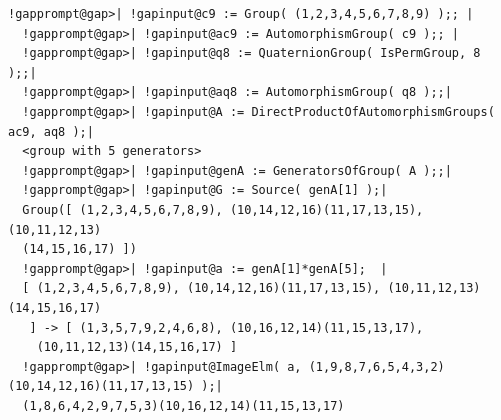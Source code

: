 \documentclass[a4paper,11pt]{report}
\begin{document}
{{\begin{Verbatim}[commandchars=!@|,fontsize=\small,frame=single,label=Example]
  !gapprompt@gap>| !gapinput@c9 := Group( (1,2,3,4,5,6,7,8,9) );; |
  !gapprompt@gap>| !gapinput@ac9 := AutomorphismGroup( c9 );; |
  !gapprompt@gap>| !gapinput@q8 := QuaternionGroup( IsPermGroup, 8 );;|
  !gapprompt@gap>| !gapinput@aq8 := AutomorphismGroup( q8 );;|
  !gapprompt@gap>| !gapinput@A := DirectProductOfAutomorphismGroups( ac9, aq8 );|
  <group with 5 generators>
  !gapprompt@gap>| !gapinput@genA := GeneratorsOfGroup( A );;|
  !gapprompt@gap>| !gapinput@G := Source( genA[1] );|
  Group([ (1,2,3,4,5,6,7,8,9), (10,14,12,16)(11,17,13,15), (10,11,12,13)
  (14,15,16,17) ])
  !gapprompt@gap>| !gapinput@a := genA[1]*genA[5];  |
  [ (1,2,3,4,5,6,7,8,9), (10,14,12,16)(11,17,13,15), (10,11,12,13)(14,15,16,17) 
   ] -> [ (1,3,5,7,9,2,4,6,8), (10,16,12,14)(11,15,13,17), 
    (10,11,12,13)(14,15,16,17) ]
  !gapprompt@gap>| !gapinput@ImageElm( a, (1,9,8,7,6,5,4,3,2)(10,14,12,16)(11,17,13,15) );|
  (1,8,6,4,2,9,7,5,3)(10,16,12,14)(11,15,13,17)
  
\end{Verbatim}
 }

 }

         
\end{document}
